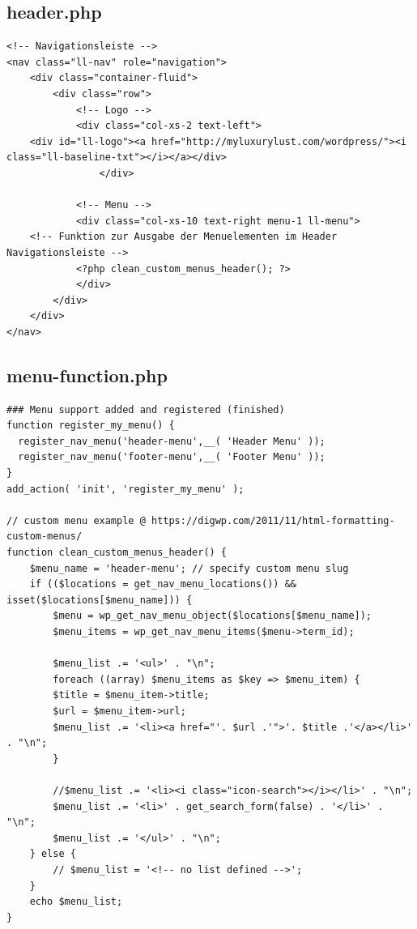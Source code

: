 \subsection*{header.php}
\begin{verbatim}
<!-- Navigationsleiste -->
<nav class="ll-nav" role="navigation">
	<div class="container-fluid">
		<div class="row">
			<!-- Logo -->
			<div class="col-xs-2 text-left">
	<div id="ll-logo"><a href="http://myluxurylust.com/wordpress/"><i class="ll-baseline-txt"></i></a></div>
				</div>
			
			<!-- Menu -->
			<div class="col-xs-10 text-right menu-1 ll-menu">
	<!-- Funktion zur Ausgabe der Menuelementen im Header Navigationsleiste -->
			<?php clean_custom_menus_header(); ?>
			</div>
		</div>
	</div>
</nav>

\end{verbatim}
\newpage
\subsection*{menu-function.php}
\begin{verbatim}
### Menu support added and registered (finished)
function register_my_menu() {
  register_nav_menu('header-menu',__( 'Header Menu' ));
  register_nav_menu('footer-menu',__( 'Footer Menu' ));
}
add_action( 'init', 'register_my_menu' );

// custom menu example @ https://digwp.com/2011/11/html-formatting-custom-menus/
function clean_custom_menus_header() {
	$menu_name = 'header-menu'; // specify custom menu slug
	if (($locations = get_nav_menu_locations()) && isset($locations[$menu_name])) {
		$menu = wp_get_nav_menu_object($locations[$menu_name]);
		$menu_items = wp_get_nav_menu_items($menu->term_id);

		$menu_list .= '<ul>' . "\n";
		foreach ((array) $menu_items as $key => $menu_item) {
		$title = $menu_item->title;
		$url = $menu_item->url;
		$menu_list .= '<li><a href="'. $url .'">'. $title .'</a></li>' . "\n";
		}
		
		//$menu_list .= '<li><i class="icon-search"></i></li>' . "\n";
		$menu_list .= '<li>' . get_search_form(false) . '</li>' . "\n";
		$menu_list .= '</ul>' . "\n";
	} else {
		// $menu_list = '<!-- no list defined -->';
	}
	echo $menu_list;
}
\end{verbatim}
\newpage


